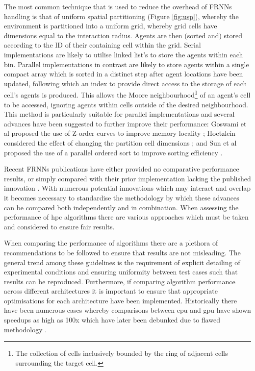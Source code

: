   The most common technique that is used to reduce the overhead of FRNNs handling is that of uniform spatial partitioning (Figure \ref{fig:usp}), whereby the environment is partitioned into a uniform grid, whereby grid cells have dimensions equal to the interaction radius. Agents are then (sorted and) stored according to the ID of their containing cell within the grid. Serial implementations are likely to utilise linked list's to store the agents within each bin. Parallel implementations in contrast are likely to store agents within a single compact array which is sorted in a distinct step after agent locations have been updated, following which an index to provide direct access to the storage of each cell’s agents is produced. This allows the Moore neighbourhood\footnote{The collection of cells inclusively bounded by the ring of adjacent cells surrounding the target cell.} of an agent’s cell to be accessed, ignoring agents within cells outside of the desired neighbourhood. This method is particularly suitable for parallel implementations \cite{Gre10} and several advances have been suggested to further improve their performance: Goswami et al proposed the use of Z-order curves to improve memory locality \cite{GS*10}; Hoetzlein considered the effect of changing the partition cell dimensions \cite{Hoe14}; and Sun et al proposed the use of a parallel ordered sort to improve sorting efficiency \cite{HY*15}.

  Recent FRNNs publications have either provided no comparative performance results, or simply compared with their prior implementation lacking the published innovation \cite{GS*10,Hoe14,HY*15}. With numerous potential innovations which may interact and overlap it becomes necessary to standardise the methodology by which these advances can be compared both independently and in combination. When assessing the performance of \gls{hpc} algorithms there are various approaches which must be taken and considered to ensure fair results.
  
  When comparing the performance of algorithms there are a plethora of recommendations to be followed to ensure that results are not misleading\cite{Bai92}. The general trend among these guidelines is the requirement of explicit detailing of experimental conditions and ensuring uniformity between test cases such that results can be reproduced. Furthermore, if comparing algorithm performance across different architectures it is important to ensure that appropriate optimisations for each architecture have been implemented. Historically there have been numerous cases whereby comparisons between \gls{cpu} and \gls{gpu} have shown speedups as high as 100x which have later been debunked due to flawed methodology \cite{LK*10}.

